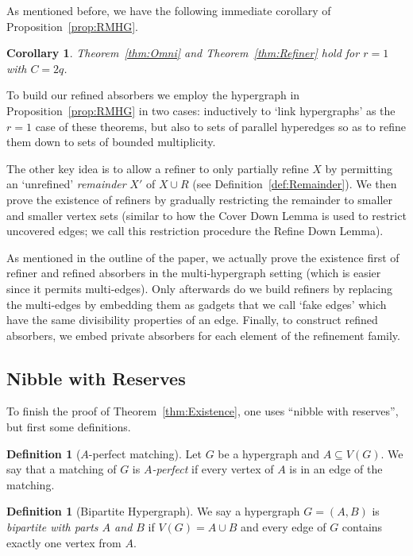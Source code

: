 \documentclass[11pt]{article}
\newcounter{i}
\theoremstyle{plain}
\newtheorem{cor}[thm]{Corollary}
\theoremstyle{plain} %
\theoremstyle{definition}
\newtheorem{definition}[thm]{Definition}
\begin{document}
As mentioned before, we have the following immediate corollary of Proposition~\ref{prop:RMHG}.

\begin{cor}\label{cor:1Uuniform}
Theorem~\ref{thm:Omni} and Theorem~\ref{thm:Refiner} hold for $r=1$ with $C=2q$.
\end{cor}

To build our refined absorbers we employ the hypergraph in Proposition~\ref{prop:RMHG} in two cases: inductively to `link hypergraphs' as the $r=1$ case of these theorems, but also to sets of parallel hyperedges so as to refine them down to sets of bounded multiplicity.

The other key idea is to allow a refiner to only partially refine $X$ by permitting an `unrefined' \emph{remainder} $X'$ of $X\cup R$ (see Definition~\ref{def:Remainder}). We then prove the existence of refiners by gradually restricting the remainder to smaller and smaller vertex sets (similar to how the Cover Down Lemma is used to restrict uncovered edges; we call this restriction procedure the Refine Down Lemma). 

As mentioned in the outline of the paper, we actually prove the existence first of refiner and refined absorbers in the multi-hypergraph setting (which is easier since it permits multi-edges). Only afterwards do we build refiners by replacing the multi-edges by embedding them as gadgets that we call `fake edges' which have the same divisibility properties of an edge. Finally, to construct refined absorbers, we embed private absorbers for each element of the refinement family.

\subsection{Nibble with Reserves}

To finish the proof of Theorem~\ref{thm:Existence}, one uses ``nibble with reserves'', but first some  definitions.

\begin{definition}[$A$-perfect matching]
Let $G$ be a hypergraph and $A\subseteq V(G)$. We say that a matching of $G$ is \emph{$A$-perfect} if every vertex of $A$ is in an edge of the matching.
\end{definition}

\begin{definition}[Bipartite Hypergraph]
We say a hypergraph $G=(A,B)$ is \emph{bipartite with parts $A$ and $B$} if $V(G)=A\cup B$ and  every edge of $G$ contains exactly one vertex from $A$. 
\end{definition}
\end{document}
